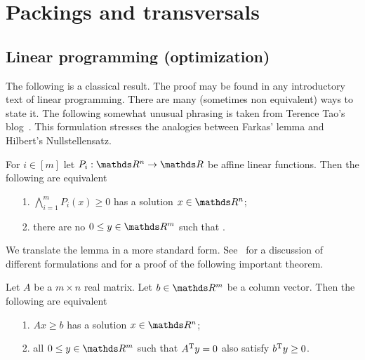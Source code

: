 \documentclass[sputnik.tex]{subfiles}
\begin{document}
\def\Fr{\mathop{\rm Fr}}

\def\vc{{\footnotesize VC}}
\def\nip{{\footnotesize NIP}}


\def\medrel#1{\parbox[t]{6ex}{$\displaystyle\hfil #1$}}
\def\ceq#1#2#3{\parbox[t]{15ex}{$\displaystyle #1$}\medrel{#2}{$\displaystyle #3$}}



\chapter{Packings and transversals}

\section{Linear programming (optimization)}\label{LP}

The following is a classical result.
The proof may be found in any introductory text of linear programming.
There are many (sometimes non equivalent) ways to state it.
The following somewhat unusual phrasing is taken from Terence Tao's blog~\cite{Tao}.
This formulation stresses the analogies between Farkas' lemma and Hilbert's Nullstellensatz.

\begin{proposition}
For $i\in[m]$ let $P_i:\RR^n\to\RR$ be affine linear functions.
Then the following are equivalent
\nobreak  
\begin{itemize}
\item[1.] $\displaystyle\bigwedge^m_{i=1}P_i(x)\ge 0$ has a solution $x\in\RR^n$;
\item[2.] there are no $0\le y\in\RR^m$ such that .\QED
\end{itemize}
\end{proposition}

We translate the lemma in a more standard form. See~\cite{GM} for a discussion of different formulations and for a proof of the following important theorem.

\begin{proposition}
Let $A$ be a $m\times n$ real matrix. 
Let $b\in\RR^m$ be a column vector.
Then the following are equivalent
\nobreak  
\begin{itemize}
\item[1.] $Ax\ge b$ has a solution $x\in\RR^n$;
\item[2.] all $0\le y\in\RR^m$ such that $A^{\rm T}y=0$ also satisfy $b^{\rm T}y\ge0$.\QED
\end{itemize}
\end{proposition}
\end{document}
